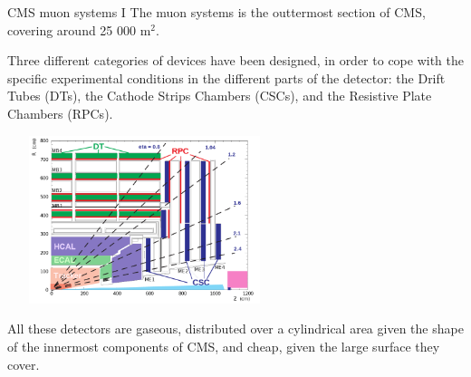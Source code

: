 \documentclass[8pt]{beamer}
\begin{document}
\begin{frame}{CMS muon systems I}
\justifying
The muon systems is the outtermost section of CMS, covering around 25 000 m$^2$. \vfill 

Three different categories of devices have been designed, in order to cope with the specific experimental conditions in the different parts of the detector: the Drift Tubes (DTs), the Cathode Strips Chambers (CSCs), and the Resistive Plate Chambers (RPCs). \vfill

\begin{center}
\includegraphics[width=8cm, height=4.9cm]{figs/CMSMuons.png}
\end{center} \vfill

All these detectors are gaseous, distributed over a cylindrical area given the shape of the innermost components of CMS, and cheap, given the large surface they cover. \vfill
\end{frame}
\end{document}
